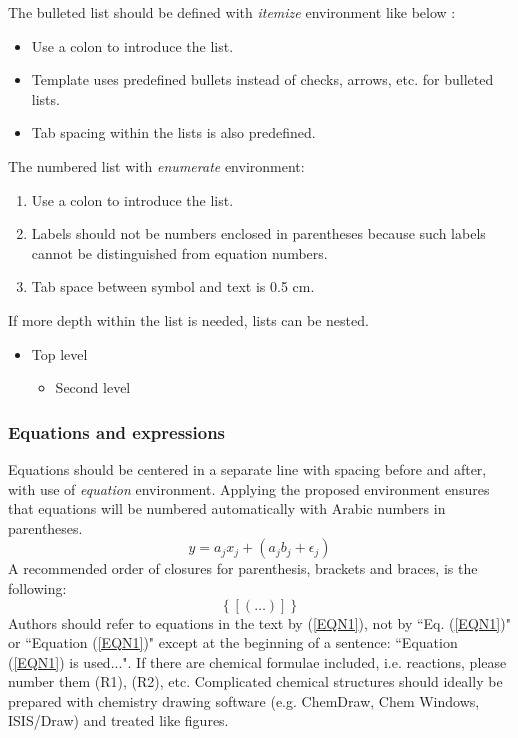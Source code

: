 \documentclass{ECOS_2021}
\begin{document}
The bulleted list should be defined with \textit{itemize} environment like below :
%
\begin{itemize}
    \item Use a colon to introduce the list.
    \item Template uses predefined bullets instead of checks, arrows, etc. for bulleted lists.
    \item Tab spacing within the lists is also predefined.
\end{itemize}
%
The numbered list with \textit{enumerate} environment:
%
\begin{enumerate}
    \item Use a colon to introduce the list.
    \item Labels should not be numbers enclosed in parentheses because such labels cannot be distinguished from equation numbers.
    \item Tab space between symbol and text is 0.5 cm.
\end{enumerate}
%
If more depth within the list is needed, lists can be nested.
%
\begin{itemize}
    \item Top level
    \begin{itemize}
        \item Second level
    \end{itemize}
\end{itemize}

\sffamily \subsubsection{Equations and expressions} \label{Equations and expressions}
\rmfamily
Equations should be centered in a separate line with spacing before and after, with use of \textit{equation} environment. Applying the proposed environment ensures that equations will be numbered automatically with Arabic numbers in parentheses.
%
\begin{equation}
        y=a_{j}x_{j}+\left( a_{j}b_{j}+\epsilon_j\right)
        \label{EQN1}
\end{equation}
%
A recommended order of closures for parenthesis, brackets and braces, is the following:
%
\begin{equation}
        \left\{ \left[ \left(\dotsc \right) \right] \right\}
        \label{EQN2}
\end{equation}
%
Authors should refer to equations in the text by (\ref{EQN1}), not by ``Eq. (\ref{EQN1})" or ``Equation (\ref{EQN1})" except at the beginning of a sentence: ``Equation (\ref{EQN1}) is used...". If there are chemical formulae included, i.e. reactions, please number them (R1), (R2), etc. Complicated chemical structures should ideally be prepared with chemistry drawing software (e.g. ChemDraw, Chem Windows, ISIS/Draw) and treated like figures.
\end{document}
